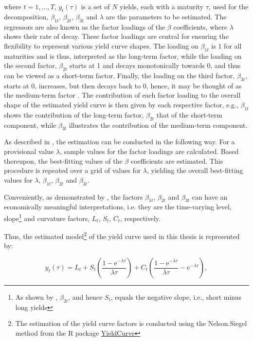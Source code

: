 where $t=1,\ldots, T$, $y_{t}(\tau)$ is a set of $N$ yields, each with a maturity $\tau$, used for the decomposition, $\beta_{1t}$, $\beta_{2t}$, $\beta_{3t}$ and $\lambda$ are the parameters to be estimated. 
The regressors are also known as the factor loadings of the $\beta$ coefficients, where $\lambda$ shows their rate of decay. 
These factor loadings are central for ensuring the flexibility to represent various yield curve shapes. 
The loading on $\beta_{1t}$ is 1 for all maturities and is thus, interpreted as the long-term factor, while the loading on the second factor, $\beta_{2t}$ starts at 1 and decays monotonically towards 0, and thus can be viewed as a short-term factor. Finally, the loading on the third factor, $\beta_{3t}$, starts at 0, increases, but then decays back to 0, hence, it may be thought of as the medium-term factor \citep{diebold2006forecasting}. The contribution of each factor loading to the overall shape of the estimated yield curve is then given by each respective factor, e.g., $\beta_{1t}$ shows the contribution of the long-term factor, $\beta_{2t}$ that of the short-term component, while $\beta_{3t}$ illustrates the contribution of the medium-term component\citep{nelson1987parsimonious}. 

As described in \citet{nelson1987parsimonious}, the estimation can be conducted in the following way. For a provisional value $\lambda$, sample values for the factor loadings are calculated. Based thereupon, the best-fitting values of the $\beta$ coefficients are estimated. This procedure is repeated over a grid of values for $\lambda$, yielding the overall best-fitting values for $\lambda$, $\beta_{1t}$, $\beta_{2t}$ and $\beta_{3t}$. 

Conveniently, as demonstrated by \citet{diebold2006forecasting}, the factors $\beta_{1t}$, $\beta_{2t}$ and $\beta_{3t}$ can have an economically meaningful interpretations, i.e. they are the time-varying level, slope\footnote{As shown by \citet{diebold2006forecasting}, $\beta_{2t}$, and hence $S_{t}$, equals the negative slope, i.e., short minus long yields} and curvature factors, $L_{t}$, $S_{t}$, $C_{t}$, respectively.


Thus, the estimated model\footnote{The estimation of the yield curve factors is conducted using the Nelson.Siegel method from the R package \href{https://cran.r-project.org/web/packages/YieldCurve/index.html}{YieldCurve}} of the yield curve used in this thesis is represented by:

\begin{equation}
\label{eq:NS_factor_interpretation}
    y_{t}(\tau)=L_{t}+S_{t}\left(\frac{1-\mathrm{e}^{-\lambda \tau}}{\lambda \tau}\right)+C_{t}\left(\frac{1-\mathrm{e}^{-\lambda \tau}}{\lambda \tau}-\mathrm{e}^{-\lambda \tau}\right),
\end{equation}


